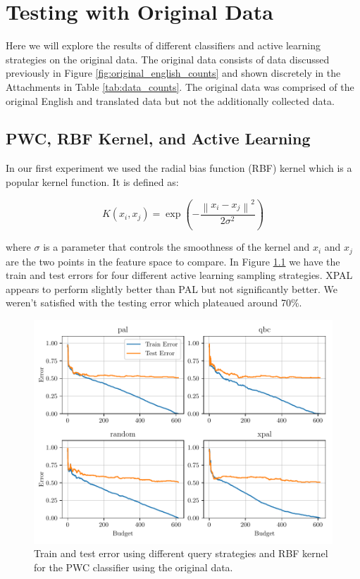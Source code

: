\chapter{Testing with Original Data}

Here we will explore the results of different classifiers and active learning strategies on the original data. The original data consists of data discussed previously in Figure \ref{fig:original_english_counts} and shown discretely in the Attachments in Table \ref{tab:data_counts}. The original data was comprised of the original English and translated data but not the additionally collected data. 

\section{PWC, RBF Kernel, and Active Learning}

In our first experiment we used the radial bias function (RBF) kernel which is a popular kernel function. It is defined as:

\begin{equation}
    K(x_i, x_j) = \exp\left(- \frac{\left\| x_i - x_j \right\|^2}{2 \sigma^2}\right)
\label{eq:rbf_kernel}
\end{equation}

where $\sigma$ is a parameter that controls the smoothness of the kernel and $x_i$ and $x_j$ are the two points in the feature space to compare. In Figure \ref{fig:plot_all_results_rbf} we have the train and test errors for four different active learning sampling strategies. XPAL appears to perform slightly better than PAL but not significantly better. We weren't satisfied with the testing error which plateaued around 70\%.

\begin{figure}[ht]
  \centering
  \includegraphics[width=\textwidth]{../img/plot_all_results_rbf_original_data}
  \caption{Train and test error using different query strategies and RBF kernel for the PWC classifier using the original data.}
  \label{fig:plot_all_results_rbf}
\end{figure}

